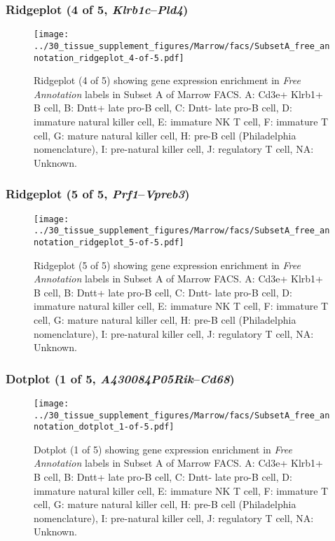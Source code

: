 \clearpage

\subsubsection{Ridgeplot (4 of 5, \emph{Klrb1c}--\emph{Pld4})}
\begin{figure}[h]
\centering
\texttt{[image: ../30\_tissue\_supplement\_figures/Marrow/facs/SubsetA\_free\_annotation\_ridgeplot\_4-of-5.pdf]}

\caption{ Ridgeplot (4 of 5)  showing gene expression enrichment in \emph{Free Annotation} labels in Subset A of Marrow FACS. A: Cd3e+ Klrb1+ B cell, B: Dntt+ late pro-B cell, C: Dntt- late pro-B cell, D: immature natural killer cell, E: immature NK T cell, F: immature T cell, G: mature natural killer cell, H: pre-B cell (Philadelphia nomenclature), I: pre-natural killer cell, J: regulatory T cell, NA: Unknown.}
\end{figure}


\clearpage

\subsubsection{Ridgeplot (5 of 5, \emph{Prf1}--\emph{Vpreb3})}
\begin{figure}[h]
\centering
\texttt{[image: ../30\_tissue\_supplement\_figures/Marrow/facs/SubsetA\_free\_annotation\_ridgeplot\_5-of-5.pdf]}

\caption{ Ridgeplot (5 of 5)  showing gene expression enrichment in \emph{Free Annotation} labels in Subset A of Marrow FACS. A: Cd3e+ Klrb1+ B cell, B: Dntt+ late pro-B cell, C: Dntt- late pro-B cell, D: immature natural killer cell, E: immature NK T cell, F: immature T cell, G: mature natural killer cell, H: pre-B cell (Philadelphia nomenclature), I: pre-natural killer cell, J: regulatory T cell, NA: Unknown.}
\end{figure}


\clearpage

\subsubsection{Dotplot (1 of 5, \emph{A430084P05Rik}--\emph{Cd68})}
\begin{figure}[h]
\centering
\texttt{[image: ../30\_tissue\_supplement\_figures/Marrow/facs/SubsetA\_free\_annotation\_dotplot\_1-of-5.pdf]}

\caption{ Dotplot (1 of 5)  showing gene expression enrichment in \emph{Free Annotation} labels in Subset A of Marrow FACS. A: Cd3e+ Klrb1+ B cell, B: Dntt+ late pro-B cell, C: Dntt- late pro-B cell, D: immature natural killer cell, E: immature NK T cell, F: immature T cell, G: mature natural killer cell, H: pre-B cell (Philadelphia nomenclature), I: pre-natural killer cell, J: regulatory T cell, NA: Unknown.}
\end{figure}


